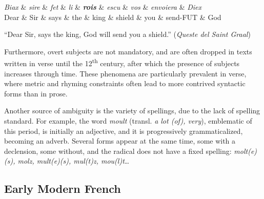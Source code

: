 \begin{center}
    \begin{dependency}[theme=simple]
        \begin{deptext}[row 2/.style={font=\small}]
            \textit{Biax} \& \textit{sire} \& \textit{fet} \& \textit{li} \& \textbf{\textit{rois}} \& \textit{escu} \& \textit{vos} \& \textit{envoiera} \& \textit{Diex} \\
            Dear \& Sir \& says \& the \& king \& shield \& you \& send-FUT \& God \\
        \end{deptext}
    \end{dependency}

    \raggedright
    \enquote{Dear Sir, says the king, God will send you a shield.} (\emph{Queste del Saint Graal})
\end{center}

Furthermore, overt subjects are not mandatory, and are often dropped in texts written in verse until the 12\textsuperscript{th} century, after which the presence of subjects increases through time.
These phenomena are particularly prevalent in verse, where metric and rhyming constraints often lead to more contrived syntactic forms than in prose.

Another source of ambiguity is the variety of spellings, due to the lack of spelling standard. For example, the word \textit{moult} (transl. \textit{a lot (of), very}), emblematic of this period, is initially an adjective, and it is progressively grammaticalized, becoming an adverb. Several forms appear at the same time, some with a declension, some without, and the radical does not have a fixed spelling: \textit{molt(e)(s), molz, mult(e)(s), mul(t)z, mou(l)t}…

\subsection{Early Modern French}\label{def:early}

